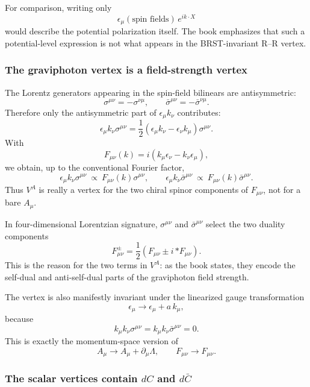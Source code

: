 \documentclass[
  10pt,
  a4paper,
  openany]{book}
\begin{document}
For comparison, writing only \[
\epsilon_\mu(\text{spin fields})\,e^{ik\cdot X}
\] would describe the potential polarization itself. The book emphasizes
that such a potential-level expression is not what appears in the
BRST-invariant R--R vertex.

\subsubsection{The graviphoton vertex is a field-strength
vertex}\label{the-graviphoton-vertex-is-a-field-strength-vertex}

The Lorentz generators appearing in the spin-field bilinears are
antisymmetric: \[
\sigma^{\mu\nu}=-\sigma^{\nu\mu},
\qquad
\bar\sigma^{\mu\nu}=-\bar\sigma^{\nu\mu}.
\] Therefore only the antisymmetric part of \(\epsilon_\mu k_\nu\)
contributes: \[
\epsilon_\mu k_\nu\sigma^{\mu\nu}
=
\frac12
\left(
\epsilon_\mu k_\nu-\epsilon_\nu k_\mu
\right)\sigma^{\mu\nu}.
\] With \[
F_{\mu\nu}(k)
=
i\left(k_\mu\epsilon_\nu-k_\nu\epsilon_\mu\right),
\] we obtain, up to the conventional Fourier factor, \[
\boxed{
\epsilon_\mu k_\nu\sigma^{\mu\nu}
\ \propto\
F_{\mu\nu}(k)\sigma^{\mu\nu},
\qquad
\epsilon_\mu k_\nu\bar\sigma^{\mu\nu}
\ \propto\
F_{\mu\nu}(k)\bar\sigma^{\mu\nu}.
}
\] Thus \(V^A\) is really a vertex for the two chiral spinor components
of \(F_{\mu\nu}\), not for a bare \(A_\mu\).

In four-dimensional Lorentzian signature, \(\sigma^{\mu\nu}\) and
\(\bar\sigma^{\mu\nu}\) select the two duality components \[
F^\pm_{\mu\nu}
=
\frac12\left(F_{\mu\nu}\pm i\,{*F}_{\mu\nu}\right).
\] This is the reason for the two terms in \(V^A\): as the book states,
they encode the self-dual and anti-self-dual parts of the graviphoton
field strength.

The vertex is also manifestly invariant under the linearized gauge
transformation \[
\epsilon_\mu\longrightarrow\epsilon_\mu+a\,k_\mu,
\] because \[
k_\mu k_\nu\sigma^{\mu\nu}
=
k_\mu k_\nu\bar\sigma^{\mu\nu}
=0.
\] This is exactly the momentum-space version of \[
A_\mu\longrightarrow A_\mu+\partial_\mu\Lambda,
\qquad
F_{\mu\nu}\longrightarrow F_{\mu\nu}.
\]

\subsubsection{\texorpdfstring{The scalar vertices contain \(dC\) and
\(d\bar C\)}{The scalar vertices contain dC and d\textbackslash bar C}}\label{the-scalar-vertices-contain-dc-and-dbar-c}
\end{document}
